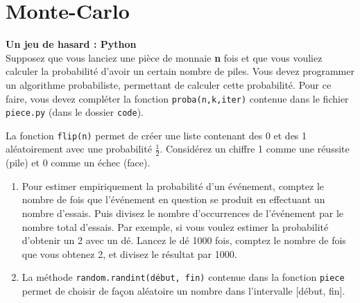 \section{Monte-Carlo}
\begin{Exercice}[10 minutes]\textbf{Un jeu de hasard : Python}\\
    Supposez que vous lanciez une pièce de monnaie \textbf{n} fois et que vous vouliez calculer la probabilité d'avoir un certain nombre de piles. Vous devez programmer un algorithme probabiliste, permettant de calculer cette probabilité. Pour ce faire, vous devez compléter la fonction \texttt{proba(n,k,iter)} contenue dans le fichier \lstinline{piece.py} (dans le dossier \lstinline{code}). \newline 
    
    La fonction \texttt{flip(n)} permet de créer une liste contenant des 0 et des 1 aléatoirement avec une probabilité $\frac{1}{2}$. Considérez un chiffre 1 comme une réussite (pile) et 0 comme un échec (face).
    \\
    \begin{conseil}
     \begin{enumerate}
            \item Pour estimer empiriquement la probabilité d'un événement, comptez le nombre de fois que l'événement en question se produit en effectuant un nombre d'essais. Puis divisez le nombre d'occurrences de l'événement par le nombre total d'essais. Par exemple, si vous voulez estimer la probabilité d'obtenir un 2 avec un dé. Lancez le dé 1000 fois, comptez le nombre de fois que vous obtenez 2, et divisez le résultat par 1000.
        \item La méthode \lstinline{random.randint(début, fin)} contenue dans la fonction \lstinline{piece} permet de choisir de façon aléatoire un nombre dans l'intervalle [début, fin].
    \end{enumerate}
    \end{conseil}
    \begin{solution}
        
    \end{solution}
    \end{Exercice}


